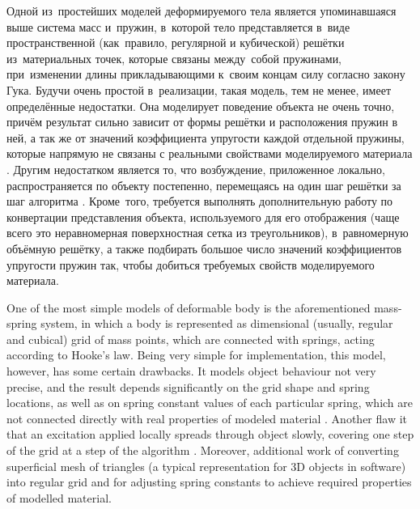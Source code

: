 \documentclass[a4paper, 12pt, titlepage]{extarticle}
\begin{document}
\begin{original}
    Одной из~простейших моделей деформируемого тела является упоминавшаяся выше система масс
    и~пружин, в~которой тело представляется в~виде пространственной (как~правило, регулярной и
    кубической) решётки из~материальных точек, которые связаны между~собой пружинами, при~изменении длины
    прикладывающими к~своим концам силу согласно закону Гука. Будучи очень простой в~реализации,
    такая модель, тем не менее, имеет определённые недостатки. Она моделирует поведение объекта не
    очень точно, причём результат сильно зависит от формы решётки и расположения пружин в ней, а так же от
    значений коэффициента упругости каждой отдельной пружины, которые напрямую не связаны с
    реальными свойствами моделируемого материала \cite[п.~3.5.2]{mueller-physmodels}.
    Другим недостатком является то, что возбуждение, приложенное локально, распространяется по
    объекту постепенно, перемещаясь на один шаг решётки за шаг алгоритма \cite[п.~4.4.1]{parent-animation}.
    Кроме~того, требуется выполнять дополнительную работу по конвертации представления объекта,
    используемого для его отображения (чаще всего это неравномерная поверхностная сетка из
    треугольников), в~равномерную объёмную решётку, а также подбирать большое число значений
    коэффициентов упругости пружин так, чтобы добиться требуемых свойств моделируемого материала.
\end{original}

    One of the most simple models of deformable body is the aforementioned mass-spring system, in
    which a body is represented as dimensional (usually, regular and cubical) grid of mass points,
    which are connected with springs, acting according to Hooke's law. Being very simple for
    implementation, this model, however, has some certain drawbacks. It models object behaviour not
    very precise, and the result depends significantly on the grid shape and spring locations, as well as on
    spring constant values of each particular spring, which are not connected directly with real
    properties of modeled material \cite[sec. 3.5.2]{mueller-physmodels}. Another flaw it that an
    excitation applied locally spreads through object slowly, covering one step of the grid at a
    step of the algorithm \cite[sec. 4.4.1]{parent-animation}. Moreover, additional work of converting
    superficial mesh of triangles (a typical representation for 3D objects in software) into regular
    grid and for adjusting spring constants to achieve required properties of modelled material.
\end{document}
